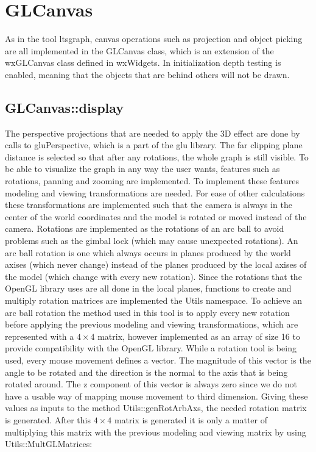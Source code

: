 \documentclass[a4paper]{article}
\begin{document}
\section{GLCanvas}
As in the tool ltsgraph, canvas operations such as projection and object picking are all implemented in the GLCanvas class, which is an extension of the wxGLCanvas class defined in wxWidgets. In initialization depth testing is enabled, meaning that the objects that are behind others will not be drawn.
\subsection{GLCanvas::display}
The perspective projections that are needed to apply the 3D effect are done by calls to gluPerspective, which is a part of the glu library. The far clipping plane distance is selected so that after any rotations, the whole graph is still visible. To be able to visualize the graph in any way the user wants, features such as rotations, panning and zooming are implemented. To implement these features modeling and viewing transformations are needed. For ease of other calculations these transformations are implemented such that the camera is always in the center of the world coordinates and the model is rotated or moved instead of the camera. 
Rotations are implemented as the rotations of an arc ball to avoid problems such as the gimbal lock (which may cause unexpected rotations). An arc ball rotation is one which always occurs in planes produced by the world axises (which never change) instead of the planes produced by the local axises of the model (which change with every new rotation). Since the rotations that the OpenGL library uses are all done in the local planes, functions to create and multiply rotation matrices are implemented the Utils namespace. To achieve an arc ball rotation the method used in this tool is to apply every new rotation before applying the previous modeling and viewing transformations, which are represented with a $4 \times 4$ matrix, however implemented as an array of size 16 to provide compatibility with the OpenGL library. While a rotation tool is being used, every mouse movement defines a vector. The magnitude of this vector is the angle to be rotated and the direction is the normal to the axis that is being rotated around. The z component of this vector is always zero since we do not have a usable way of mapping mouse movement to third dimension. Giving these values as inputs to the method Utils::genRotArbAxs, the needed rotation matrix is generated. After this $4 \times 4$ matrix is generated it is only a matter of multiplying this matrix with the previous modeling and viewing matrix by using Utils::MultGLMatrices:
\end{document}
